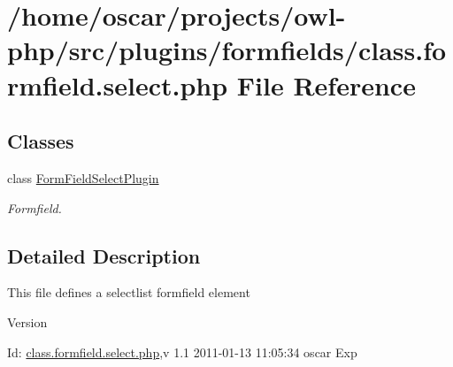 \section{/home/oscar/projects/owl-\/php/src/plugins/formfields/class.formfield.select.php File Reference}
\label{class_8formfield_8select_8php}
\subsection*{Classes}
\begin{DoxyCompactItemize}
\item 
class \hyperlink{classFormFieldSelectPlugin}{FormFieldSelectPlugin}
\begin{DoxyCompactList}\small\item\em Formfield. \item\end{DoxyCompactList}\end{DoxyCompactItemize}


\subsection{Detailed Description}
This file defines a selectlist formfield element \begin{DoxyVersion}{Version}

\end{DoxyVersion}
\begin{DoxyParagraph}{Id:}
\hyperlink{class_8formfield_8select_8php}{class.formfield.select.php},v 1.1 2011-\/01-\/13 11:05:34 oscar Exp 
\end{DoxyParagraph}
